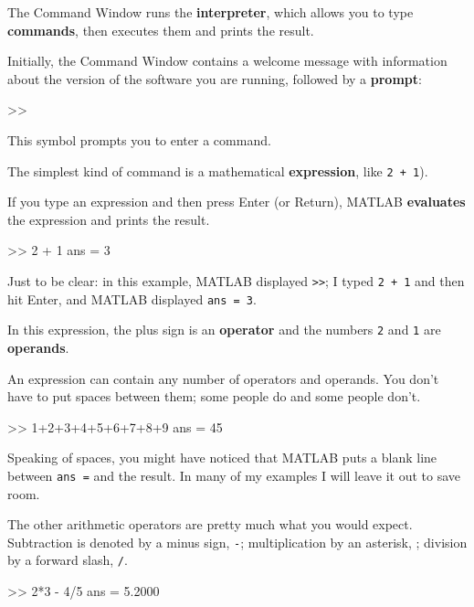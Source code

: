 \documentclass[
]{book}
\numberwithin{Answer}{chapter}
\numberwithin{Exercise}{chapter}
\begin{document}
The Command Window runs the {\bf interpreter}, which allows you
to type {\bf commands}, then executes them and prints the
result.


Initially, the Command Window contains a welcome message with information
about the version of the software you are running, followed by a {\bf prompt}:

\begin{code}
>>
\end{code}

This symbol prompts you to enter a command.

The simplest kind of command is a mathematical {\bf expression},
like {\tt 2 + 1}).


If you type an expression and then press Enter (or Return), MATLAB
{\bf evaluates} the expression and prints the result.

\begin{code}
>> 2 + 1
ans = 3
\end{code}

Just to be clear: in this example, MATLAB displayed {\tt >>}; I
typed {\tt 2 + 1} and then hit Enter, and MATLAB displayed {\tt ans = 3}.


In this expression, the plus sign is an {\bf operator} and the numbers {\tt 2} and {\tt 1} are {\bf operands}.

An expression can contain any number of operators and operands.  You
don't have to put spaces between them; some people do and some people
don't.

\begin{code}
>> 1+2+3+4+5+6+7+8+9
ans = 45
\end{code}

Speaking of spaces, you might have noticed that MATLAB puts a blank
line between {\tt ans =} and the result.  In many of my examples I will leave it out to save room.


The other arithmetic operators are pretty much what you would expect.
Subtraction is denoted by a minus sign, {\tt -}; multiplication by
an asterisk, {\tt *}; division by a forward slash, {\tt /}.

\begin{code}
>> 2*3 - 4/5
ans = 5.2000
\end{code}
\end{document}
